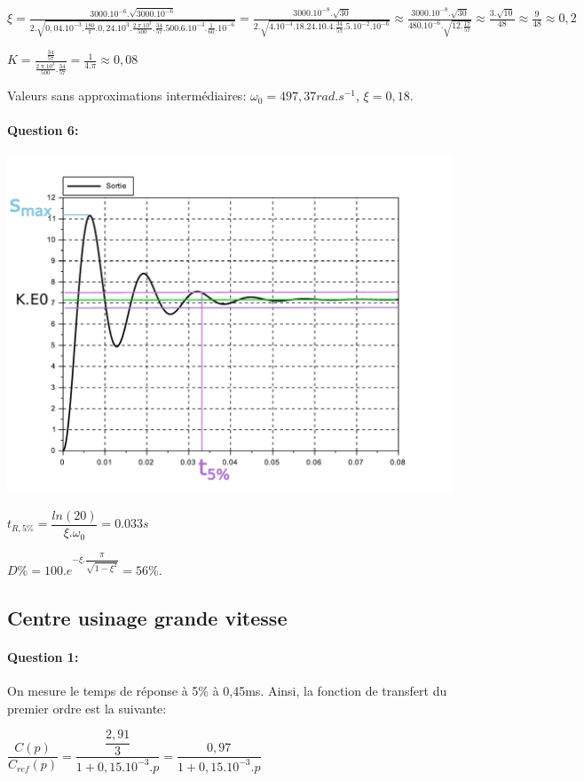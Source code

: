 $\xi=\frac{3000.10^{-6}.\sqrt{3000.10^{-6}}}{2.\sqrt{0,04.10^{-3}.\frac{180}{\pi}.0,24.10^3.\frac{2.\pi.10^3}{500}.\frac{34}{57}.500.6.10^{-3}.\frac{1}{60}.10^{-6}}}=\frac{3000.10^{-8}.\sqrt{30}}{2.\sqrt{4.10^{-4}.18.24.10.4.\frac{34}{57}.5.10^{-2}.10^{-6}}}\approx\frac{3000.10^{-8}.\sqrt{30}}{480.10^{-6}.\sqrt{12.\frac{17}{57}}}\approx\frac{3.\sqrt{10}}{48}\approx\frac{9}{48}\approx0,2$

$K=\frac{\frac{34}{57}}{\frac{2.\pi.10^3}{500}.\frac{34}{57}}=\frac{1}{4.\pi}\approx0,08$

Valeurs sans approximations intermédiaires:
$\omega_0=497,37rad.s^{-1}$, $\xi=0,18$.

\paragraph{Question 6:}

\begin{center}
 \includegraphics[width=0.7\linewidth]{img/diravi_temp}
\end{center}

$t_{R,5\%}=\dfrac{ln(20)}{\xi.\omega_0}=0.033s$

$D\%=100.e^{-\xi.\dfrac{\pi}{\sqrt{1-\xi^2}}}=56\%$.

\subsection{Centre usinage grande vitesse}

\paragraph{Question 1:} On mesure le temps de réponse à 5\% à 0,45ms. Ainsi, la fonction de transfert du premier ordre est la suivante:

$\dfrac{C(p)}{C_{ref}(p)}=\dfrac{\dfrac{2,91}{3}}{1+0,15.10^{-3}.p}=\dfrac{0,97}{1+0,15.10^{-3}.p}$

